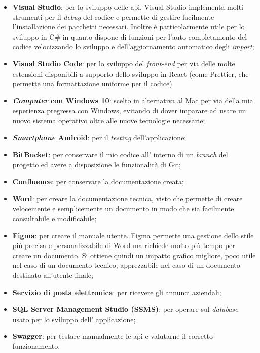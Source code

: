 \begin{itemize}
    \item \textbf{Visual Studio}: per lo sviluppo delle \gls{api}, Visual Studio implementa molti strumenti per 
          il \textit{debug} del codice e permette di gestire facilmente l'installazione dei pacchetti necessari. 
          Inoltre è particolarmente utile per lo sviluppo in C\# in quanto dispone di funzioni per l'auto completamento 
          del codice velocizzando lo sviluppo e dell'aggiornamento automatico degli \textit{import};
    \item \textbf{Visual Studio Code}: per lo sviluppo del \textit{front-end} per via delle molte estensioni 
          disponibili a supporto dello sviluppo in React (come Prettier, che permette una formattazione uniforme 
          per il codice).
    \item \textbf{\textit{Computer} con Windows 10}: scelto in alternativa al Mac per via della mia esperienza pregressa 
          con Windows, evitando di dover imparare ad usare un nuovo sistema operativo oltre alle nuove tecnologie necessarie;
    \item \textbf{\textit{Smartphone} Android}: per il \textit{testing} dell'applicazione;
    \item \textbf{BitBucket}: per conservare il mio codice all' interno di un \textit{branch} del progetto ed avere a 
        disposizione le funzionalità di Git;
    \item \textbf{Confluence}: per conservare la documentazione creata;
    \item \textbf{Word}: per creare la documentazione tecnica, visto che permette di creare velocemente e semplicemente un 
          documento in modo che sia facilmente consultabile e modificabile;
    \item \textbf{Figma}: per creare il manuale utente. Figma permette una gestione dello stile più precisa e personalizzabile
          di Word ma richiede molto più tempo per creare un documento. Si ottiene quindi un impatto grafico migliore, poco utile nel 
          caso di un documento tecnico, apprezzabile nel caso di un documento destinato all'utente finale;
    \item \textbf{Servizio di posta elettronica}: per ricevere gli annunci aziendali;
    \item \textbf{SQL Server Management Studio (SSMS)}: per operare sul \textit{database} usato per lo sviluppo dell'
          applicazione;
    \item \textbf{Swagger}: per testare manualmente le \gls{api} e valutarne il corretto funzionamento.
\end{itemize}
